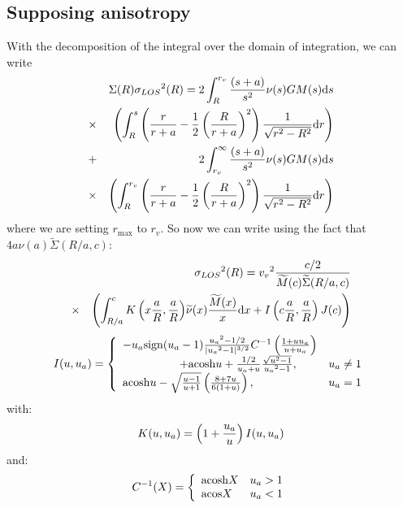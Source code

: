 \subsection{Supposing \citet{ML05} anisotropy}
%
With the decomposition of the integral over the domain of integration, we can
write
%
\begin{eqnarray}
    &&\Sigma{(R)}{\sigma_{LOS}}^2{(R)}=2\int_R^{r_v}{\frac{\left({s+a}\right)}{s^2}{\nu(s)}{G}{M(s)}}{{\rm{d}}{s}}\nonumber\\
    &\times&\left(\int_R^s{\left(\frac{r}{r+a}-\frac{1}{2}\left(\frac{R}{r+a}\right)^2\right)\frac{1}{\sqrt{r^2-R^2}}{\rm{d}}{r}}\right)\nonumber\\
    &+&2\int_{r_v}^{\infty}{\frac{\left({s+a}\right)}{s^2}{\nu(s)}{G}{M(s)}}{{\rm{d}}{s}}\nonumber\\
    &\times&\left(\int_R^{r_v}{\left(\frac{r}{r+a}-\frac{1}{2}\left(\frac{R}{r+a}\right)^2\right)\frac{1}{\sqrt{r^2-R^2}}{\rm{d}}{r}}\right)\nonumber\\
\end{eqnarray}
%
where we are setting $r_{\max}$ to $r_v$. So now we can write using the
fact that $4a\nu(a)\widetilde{\Sigma}(R/a,c)$:
%
\begin{eqnarray}
    &&{\sigma_{LOS}}^2{(R)}={v_v}^2\frac{c/2}{\widetilde{M}{(c)}\widetilde{\Sigma}{(R/a,c)}}\nonumber\\
    &\times&\left(\int_{R/a}^c{{K}\left({x\frac{a}{R},\frac{a}{R}}\right)}\widetilde{\nu}{(x)}
    \frac{\widetilde{M}{(x)}}{x}{\rm{d}}{x}+I\left({c\frac{a}{R},\frac{a}{R}}\right){J(c)}\right)\nonumber\\
\end{eqnarray}
%
\begin{equation}
    I(u,u_a)=\left\{\begin{array}{lr}
        -u_a{\rm{sign}}(u_a-1)\frac{{u_a}^2-1/2}{|{u_a}^2-1|^{3/2}}{C^{-1}\left(\frac{1+u{u_a}}{u+u_a}\right)}&\\
        \hspace{5em}+{\rm{acosh}}{u}+\frac{1/2}{u_a+u}\frac{\sqrt{u^2-1}}{{u_a}^2-1},&{u_a}\neq1\\
        {\rm{acosh}}{u}-\sqrt{\frac{u-1}{u+1}}\left(\frac{8+7u}{6(1+u)}\right),&{u_a}=1\\
    \end{array}\right.
\end{equation}
%
with:
%
\begin{equation}
    K(u,u_a)=\left({1+\frac{u_a}{u}}\right){I(u,u_a)}
\end{equation}
%
and:
%
\begin{equation}
    C^{-1}(X)=\left\{\begin{array}{lr}
        {\rm{acosh}}{X}&u_a>1\\
        {\rm{acos}}{X}&u_a<1\\
    \end{array}\right.
\end{equation}
